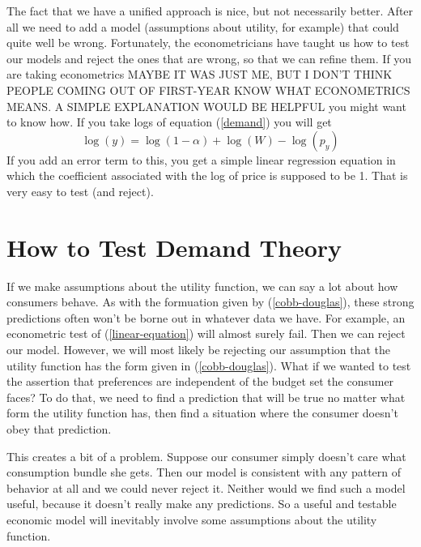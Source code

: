 \documentclass[12pt]{article}
\begin{document}
The fact that we have a unified approach is nice, but not necessarily better.
After all we need to add a model (assumptions about utility, for example) that
could quite well be wrong. Fortunately, the econometricians have taught us how
to test our models and reject the ones that are wrong, so that we can refine
them. If you are taking econometrics MAYBE IT WAS JUST ME, BUT I DON'T THINK PEOPLE COMING OUT OF FIRST-YEAR KNOW WHAT ECONOMETRICS MEANS.  A SIMPLE EXPLANATION WOULD BE HELPFUL you might want to know how. If you take
logs of equation (\ref{demand}) you will get
\begin{equation}
  \log ( y ) = \log ( 1 - \alpha ) + \log ( W ) - \log ( p_y )
  \label{linear-equation}
\end{equation}
If you add an error term to this, you get a simple linear regression equation
in which the coefficient associated with the log of price is supposed to be 1.
That is very easy to test (and reject).

\section{How to Test Demand Theory}

If we make assumptions about the utility function, we can say a lot about how
consumers behave. As with the formuation given by (\ref{cobb-douglas}), these
strong predictions often won't be borne out in whatever data we have. For
example, an econometric test of (\ref{linear-equation}) will almost surely
fail. Then we can reject our model. However, we will most likely be rejecting
our assumption that the utility function has the form given in
(\ref{cobb-douglas}). What if we wanted to test the assertion that preferences
are independent of the budget set the consumer faces? To do that, we need to
find a prediction that will be true no matter what form the utility function
has, then find a situation where the consumer doesn't obey that prediction.

This creates a bit of a problem. Suppose our consumer simply doesn't care
what consumption bundle she gets. Then our model is consistent with any
pattern of behavior at all and we could never reject it. Neither would we find
such a model useful, because it doesn't really make any predictions. So a
useful and testable economic model will inevitably involve some assumptions
about the utility function.
\end{document}
